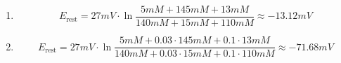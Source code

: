 \documentclass{scrartcl}
\begin{document}
\begin{enumerate}
\item
\begin{equation*}
E_{\text{rest}} = 27 \si{mV} \cdot \ln \frac{5 \si{mM} + 145 \si{mM} + 13 \si{mM}}{140 \si{mM} + 15 \si{mM} + 110 \si{mM}}  \approx -13.12 \si{mV}
\end{equation*}
\item
\begin{equation*}
E_{\text{rest}} = 27 \si{mV} \cdot \ln \frac{5 \si{mM} + 0.03 \cdot 145 \si{mM} + 0.1 \cdot 13 \si{mM}}{140 \si{mM} + 0.03 \cdot 15 \si{mM} + 0.1 \cdot 110 \si{mM}} \approx -71.68 \si{mV}
\end{equation*}

\end{enumerate}
\end{document}
